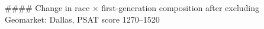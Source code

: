 #### Change in race × first-generation composition after excluding Geomarket: Dallas, PSAT score 1270–1520
